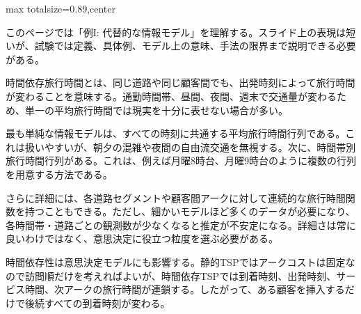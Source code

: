 \begin{minipage}[t]{0.58\textwidth}
\begin{adjustbox}{max totalsize={\textwidth}{0.89\textheight},center}
\begin{minipage}{\textwidth}\scriptsize
{}このページでは「例I: 代替的な情報モデル」を理解する。スライド上の表現は短いが、試験では定義、具体例、モデル上の意味、手法の限界まで説明できる必要がある。\par
時間依存旅行時間とは、同じ道路や同じ顧客間でも、出発時刻によって旅行時間が変わることを意味する。通勤時間帯、昼間、夜間、週末で交通量が変わるため、単一の平均旅行時間では現実を十分に表せない場合が多い。\par
最も単純な情報モデルは、すべての時刻に共通する平均旅行時間行列である。これは扱いやすいが、朝夕の混雑や夜間の自由流交通を無視する。次に、時間帯別旅行時間行列がある。これは、例えば月曜8時台、月曜9時台のように複数の行列を用意する方法である。\par
さらに詳細には、各道路セグメントや顧客間アークに対して連続的な旅行時間関数を持つこともできる。ただし、細かいモデルほど多くのデータが必要になり、各時間帯・道路ごとの観測数が少なくなると推定が不安定になる。詳細さは常に良いわけではなく、意思決定に役立つ粒度を選ぶ必要がある。\par
時間依存性は意思決定モデルにも影響する。静的TSPではアークコストは固定なので訪問順だけを考えればよいが、時間依存TSPでは到着時刻、出発時刻、サービス時間、次アークの旅行時間が連鎖する。したがって、ある顧客を挿入するだけで後続すべての到着時刻が変わる。\par

\end{minipage}
\end{adjustbox}
\end{minipage}
